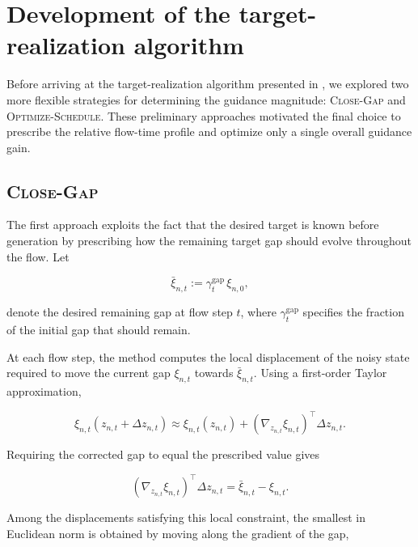 \chapter{Development of the target-realization algorithm}
\label{app:target-realization-development}

Before arriving at the target-realization algorithm presented in
, we explored two more flexible strategies for
determining the guidance magnitude: \textsc{Close-Gap} and
\textsc{Optimize-Schedule}. These preliminary approaches motivated the final
choice to prescribe the relative flow-time profile and optimize only a single
overall guidance gain.

\section{\textsc{Close-Gap}}
\label{app:close-gap}

The first approach exploits the fact that the desired target is known before
generation by prescribing how the remaining target gap should evolve throughout
the flow. Let

\begin{equation}
    \bar{\xi}_{n,t}
    :=
    \gamma_t^{\mathrm{gap}}\,\xi_{n,0},
    \label{eq:app-close-gap-path}
\end{equation}

denote the desired remaining gap at flow step $t$, where
$\gamma_t^{\mathrm{gap}}$ specifies the fraction of the initial gap that should
remain.

At each flow step, the method computes the local displacement of the noisy
state required to move the current gap $\xi_{n,t}$ towards
$\bar{\xi}_{n,t}$. Using a first-order Taylor approximation,

\begin{equation}
    \xi_{n,t}(z_{n,t}+\Delta z_{n,t})
    \approx
    \xi_{n,t}(z_{n,t})
    +
    \left(
        \nabla_{z_{n,t}}\xi_{n,t}
    \right)^\top
    \Delta z_{n,t}.
\end{equation}

Requiring the corrected gap to equal the prescribed value gives

\begin{equation}
    \left(
        \nabla_{z_{n,t}}\xi_{n,t}
    \right)^\top
    \Delta z_{n,t}
    =
    \bar{\xi}_{n,t}-\xi_{n,t}.
\end{equation}

Among the displacements satisfying this local constraint, the smallest in
Euclidean norm is obtained by moving along the gradient of the gap,

